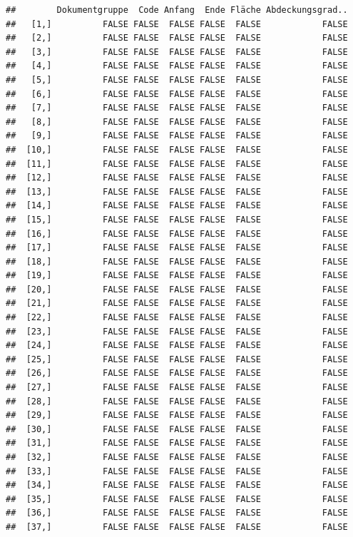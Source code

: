 \documentclass[
  english,
  man,floatsintext]{apa6}
\begin{document}
\begin{verbatim}
##        Dokumentgruppe  Code Anfang  Ende Fläche Abdeckungsgrad..
##   [1,]          FALSE FALSE  FALSE FALSE  FALSE            FALSE
##   [2,]          FALSE FALSE  FALSE FALSE  FALSE            FALSE
##   [3,]          FALSE FALSE  FALSE FALSE  FALSE            FALSE
##   [4,]          FALSE FALSE  FALSE FALSE  FALSE            FALSE
##   [5,]          FALSE FALSE  FALSE FALSE  FALSE            FALSE
##   [6,]          FALSE FALSE  FALSE FALSE  FALSE            FALSE
##   [7,]          FALSE FALSE  FALSE FALSE  FALSE            FALSE
##   [8,]          FALSE FALSE  FALSE FALSE  FALSE            FALSE
##   [9,]          FALSE FALSE  FALSE FALSE  FALSE            FALSE
##  [10,]          FALSE FALSE  FALSE FALSE  FALSE            FALSE
##  [11,]          FALSE FALSE  FALSE FALSE  FALSE            FALSE
##  [12,]          FALSE FALSE  FALSE FALSE  FALSE            FALSE
##  [13,]          FALSE FALSE  FALSE FALSE  FALSE            FALSE
##  [14,]          FALSE FALSE  FALSE FALSE  FALSE            FALSE
##  [15,]          FALSE FALSE  FALSE FALSE  FALSE            FALSE
##  [16,]          FALSE FALSE  FALSE FALSE  FALSE            FALSE
##  [17,]          FALSE FALSE  FALSE FALSE  FALSE            FALSE
##  [18,]          FALSE FALSE  FALSE FALSE  FALSE            FALSE
##  [19,]          FALSE FALSE  FALSE FALSE  FALSE            FALSE
##  [20,]          FALSE FALSE  FALSE FALSE  FALSE            FALSE
##  [21,]          FALSE FALSE  FALSE FALSE  FALSE            FALSE
##  [22,]          FALSE FALSE  FALSE FALSE  FALSE            FALSE
##  [23,]          FALSE FALSE  FALSE FALSE  FALSE            FALSE
##  [24,]          FALSE FALSE  FALSE FALSE  FALSE            FALSE
##  [25,]          FALSE FALSE  FALSE FALSE  FALSE            FALSE
##  [26,]          FALSE FALSE  FALSE FALSE  FALSE            FALSE
##  [27,]          FALSE FALSE  FALSE FALSE  FALSE            FALSE
##  [28,]          FALSE FALSE  FALSE FALSE  FALSE            FALSE
##  [29,]          FALSE FALSE  FALSE FALSE  FALSE            FALSE
##  [30,]          FALSE FALSE  FALSE FALSE  FALSE            FALSE
##  [31,]          FALSE FALSE  FALSE FALSE  FALSE            FALSE
##  [32,]          FALSE FALSE  FALSE FALSE  FALSE            FALSE
##  [33,]          FALSE FALSE  FALSE FALSE  FALSE            FALSE
##  [34,]          FALSE FALSE  FALSE FALSE  FALSE            FALSE
##  [35,]          FALSE FALSE  FALSE FALSE  FALSE            FALSE
##  [36,]          FALSE FALSE  FALSE FALSE  FALSE            FALSE
##  [37,]          FALSE FALSE  FALSE FALSE  FALSE            FALSE

\end{verbatim}
\end{document}
